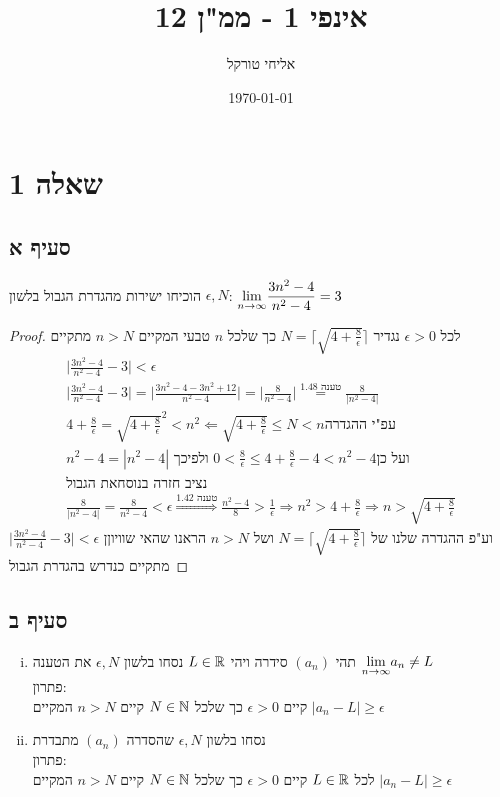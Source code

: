 \documentclass{article}
\title{אינפי 1 - ממ"ן 12}
\author{אליחי טורקל \ID}
\date\today
\begin{document}
	\maketitle %

	\section*{שאלה 1}
	\subsection*{סעיף א}
	הוכיחו ישירות מהגדרת הגבול בלשון $\epsilon, N$:
	$\displaystyle{\lim_{n \to \infty}} \frac{3n^2-4}{n^2-4} = 3$

	\begin{proof}
		לכל $\epsilon > 0$ נגדיר
		$N = \bigg\lceil \sqrt{4 + \frac{8}{\epsilon}}\bigg\rceil$
		כך שלכל $n$ טבעי המקיים $n > N$ מתקיים \\
		\begin{align*}
			\bigg|  \frac{3n^2-4}{n^2-4} - 3 \bigg| < \epsilon \\
			\bigg|  \frac{3n^2-4}{n^2-4} - 3 \bigg| =
			\bigg|  \frac{3n^2-4 -3n^2 + 12}{n^2-4} \bigg| =
			\bigg|  \frac{8}{n^2-4} \bigg| \overset{\text{טענה 1.48}}=
			\frac{8}{|n^2-4|} \\
			4 + \frac{8}{\epsilon} =
			\sqrt{4 + \frac{8}{\epsilon}}^2 < n^2
			\Leftarrow
			\sqrt{4 + \frac{8}{\epsilon}} \leq N < n
			\text{עפ"י ההגדרה } \\
			n^2 - 4 = |n^2-4|
			\text{ ולפיכך }
			0 < \frac{8}{\epsilon} \leq 4 + \frac{8}{\epsilon} - 4 < n^2 - 4
			\text{ועל כן } \\
			\text{נציב חזרה בנוסחאת הגבול} \\
			\frac{8}{|n^2-4|} = \frac{8}{n^2-4} < \epsilon
			\overset{\text{טענה 1.42}}\Rightarrow
			\frac{n^2-4}{8} > \frac{1}{\epsilon}
			\Rightarrow
			n^2 > 4 + \frac{8}{\epsilon}
			\Rightarrow
			n > \sqrt{4 + \frac{8}{\epsilon}}
		\end{align*}
		וע"פ ההגדרה שלנו של $N = \bigg\lceil \sqrt{4 + \frac{8}{\epsilon}}\bigg\rceil$
		ושל $n > N$
		הראנו שהאי שוויוןן $\bigg|  \frac{3n^2-4}{n^2-4} - 3 \bigg| < \epsilon$ מתקיים כנדרש בהגדרת הגבול
	\end{proof}

	\subsection*{סעיף ב}
	\begin{enumerate}[(i)]
		\item תהי $(a_n)$ סידרה ויהי $L \in \mathbb{R}$ נסחו בלשון $\epsilon, N$
		 את הטענה $\displaystyle{\lim_{n \to \infty}}a_n \neq L$ \\
		 פתרון: \\
קיים $\epsilon > 0$ כך שלכל $N \in \mathbb{N}$ קיים $n > N$ המקיים $|a_n-L| \geq \epsilon$

	\item נסחו בלשון $\epsilon, N$ שהסדרה $(a_n)$ מתבדרת\\
	פתרון: \\
לכל $L \in \mathbb{R}$ 	קיים $\epsilon > 0$ כך שלכל $N \in \mathbb{N}$ קיים $n > N$ המקיים $|a_n-L| \geq \epsilon$
	\end{enumerate}
\end{document}
